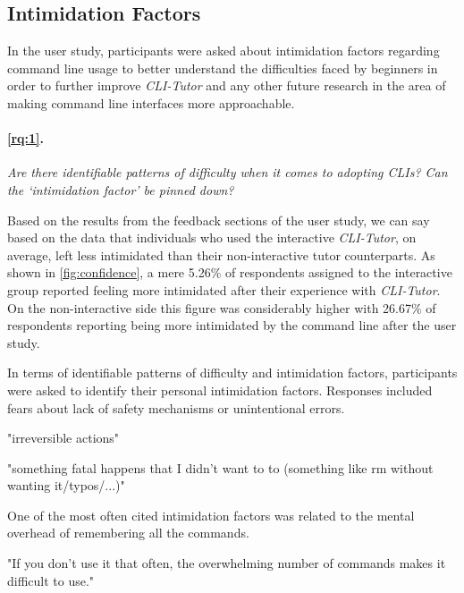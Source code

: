 \FloatBarrier %

\subsection{Intimidation Factors}

In the user study, participants were asked about intimidation factors regarding
command line usage to better understand the difficulties faced by
beginners in order to further improve \textit{CLI-Tutor} and any other future
research in the area of making command line interfaces more approachable.


\paragraph{\ref{rq:1}.} \textit{Are there identifiable patterns of difficulty when it comes to
	adopting CLIs? Can the `intimidation factor' be pinned down?}

Based on the results from the feedback sections of the user study, we can say
based on the data that individuals who used the interactive \textit{CLI-Tutor},
on average, left less intimidated than their non-interactive tutor
counterparts. As shown in \autoref{fig:confidence}, a mere 5.26\% of
respondents assigned to the interactive group reported feeling more intimidated
after their experience with \textit{CLI-Tutor}. On the non-interactive side
this figure was considerably higher with 26.67\% of respondents reporting
being more intimidated by the command line after the user study.

In terms of identifiable patterns of difficulty and intimidation factors,
participants were asked to identify their personal intimidation factors. Responses
included fears about lack of safety mechanisms or unintentional errors.

\begin{quotes}
	"irreversible actions"
\end{quotes}

\begin{quotes}
	"something fatal happens that I didn't want to to (something like rm without wanting it/typos/...)"
\end{quotes}

One of the most often cited intimidation factors was related to the mental overhead of remembering all the commands.
\begin{quotes}
	"If you don't use it that often, the overwhelming number of commands makes it difficult to use."
\end{quotes}

